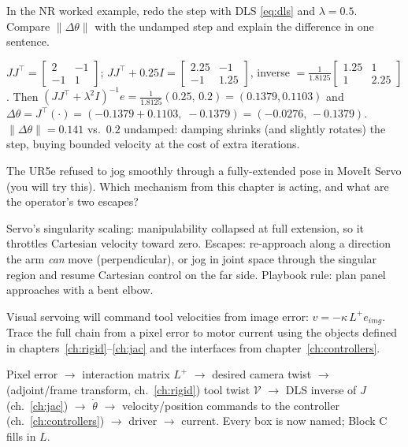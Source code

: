 \begin{problem}
In the NR worked example, redo the step with DLS \eqref{eq:dls} and $\lambda = 0.5$. Compare
$\|\Delta\theta\|$ with the undamped step and explain the difference in one sentence.
\end{problem}
\begin{answer}
$JJ^\top = \begin{bmatrix} 2 & -1 \\ -1 & 1\end{bmatrix}$;
$JJ^\top + 0.25 I = \begin{bmatrix} 2.25 & -1 \\ -1 & 1.25\end{bmatrix}$, inverse
$= \tfrac{1}{1.8125}\begin{bmatrix}1.25 & 1 \\ 1 & 2.25\end{bmatrix}$. Then
$(JJ^\top{+}\lambda^2I)^{-1}e = \tfrac{1}{1.8125}(0.25,\, 0.2) = (0.1379, 0.1103)$ and
$\Delta\theta = J^\top(\cdot) = (-0.1379{+}0.1103,\; -0.1379) = (-0.0276,\, -0.1379)$.
$\|\Delta\theta\| = 0.141$ vs.\ $0.2$ undamped: damping shrinks (and slightly rotates) the
step, buying bounded velocity at the cost of extra iterations.
\end{answer}

\begin{problem}
The UR5e refused to jog smoothly through a fully-extended pose in MoveIt Servo (you will try
this). Which mechanism from this chapter is acting, and what are the operator's two escapes?
\end{problem}
\begin{answer}
Servo's singularity scaling: manipulability collapsed at full extension, so it throttles
Cartesian velocity toward zero. Escapes: re-approach along a direction the arm \emph{can}
move (perpendicular), or jog in joint space through the singular region and resume Cartesian
control on the far side. Playbook rule: plan panel approaches with a bent elbow.
\end{answer}

\begin{problem}
Visual servoing will command tool velocities from image error: $v = -\kappa\, L^{+} e_{img}$.
Trace the full chain from a pixel error to motor current using the objects defined in
chapters~\ref{ch:rigid}--\ref{ch:jac} and the interfaces from chapter~\ref{ch:controllers}.
\end{problem}
\begin{answer}
Pixel error $\to$ interaction matrix $L^+$ $\to$ desired camera twist $\to$ (adjoint/frame
transform, ch.~\ref{ch:rigid}) tool twist $\mathcal V$ $\to$ DLS inverse of $J$
(ch.~\ref{ch:jac}) $\to$ $\dot\theta$ $\to$ velocity/position commands to the controller
(ch.~\ref{ch:controllers}) $\to$ driver $\to$ current. Every box is now named; Block C fills
in $L$.
\end{answer}
